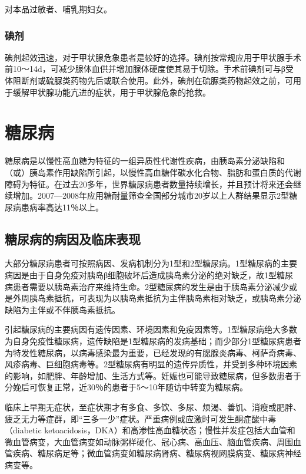 对本品过敏者、哺乳期妇女。

\subsubsection{碘剂}

碘剂起效迅速，对于甲状腺危象患者是较好的选择。碘剂按常规应用于甲状腺手术前10～14d，可减少腺体血供并增加腺体硬度使其易于切除。手术前碘剂可与β受体阻断剂或硫脲类药物先后或联合使用。此外，碘剂在硫脲类药物起效之前，可用于缓解甲状腺功能亢进的症状，用于甲状腺危象的抢救。

\section{糖尿病}

糖尿病是以慢性高血糖为特征的一组异质性代谢性疾病，由胰岛素分泌缺陷和（或）胰岛素作用缺陷所引起，以慢性高血糖伴碳水化合物、脂肪和蛋白质的代谢障碍为特征。在过去20多年，世界糖尿病患者数量持续增长，并且预计将来还会继续增加。2007---2008年应用糖耐量筛查全国部分城市20岁以上人群结果显示2型糖尿病患病率高达11％以上。

\subsection{糖尿病的病因及临床表现}

大部分糖尿病患者可按照病因、发病机制分为1型和2型糖尿病。1型糖尿病的主要病因是由于自身免疫对胰岛β细胞破坏后造成胰岛素分泌的绝对缺乏，故1型糖尿病患者需要以胰岛素治疗来维持生命。2型糖尿病的发生是由于胰岛素分泌减少或是外周胰岛素抵抗，可表现为以胰岛素抵抗为主伴胰岛素相对缺乏，或胰岛素分泌缺陷为主伴或不伴胰岛素抵抗。

引起糖尿病的主要病因有遗传因素、环境因素和免疫因素等。1型糖尿病绝大多数为自身免疫性糖尿病，遗传缺陷是1型糖尿病的发病基础；而少部分1型糖尿病患者为特发性糖尿病，以病毒感染最为重要，已经发现的有腮腺炎病毒、柯萨奇病毒、风疹病毒、巨细胞病毒等。2型糖尿病有明显的遗传异质性，并受到多种环境因素的影响，如肥胖、年龄增加、生活方式等。妊娠也可能导致糖尿病，但多数患者于分娩后可恢复正常，近30％的患者于5～10年随访中转变为糖尿病。

临床上早期无症状，至症状期才有多食、多饮、多尿、烦渴、善饥、消瘦或肥胖、疲乏无力等症群，即“三多一少”症状。严重病例或应激时可发生酮症酸中毒（diabetic
ketoacidosis，DKA）和高渗性高血糖状态；慢性并发症包括大血管和微血管病变，大血管病变如动脉粥样硬化、冠心病、高血压、脑血管疾病、周围血管疾病、糖尿病足等；微血管病变如糖尿病肾病、糖尿病视网膜病变、糖尿病神经病变等。

